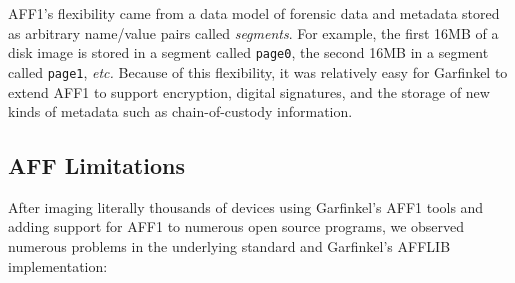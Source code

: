 \documentclass[10pt, conference]{IEEEtran}
\begin{document}
AFF1's flexibility came from a data model of forensic data and metadata
stored as arbitrary name/value pairs called \emph{segments}. For
example, the first 16MB of a disk image is stored in a segment called
\texttt{page0}, the second 16MB in a segment called \texttt{page1},
\emph{etc.} Because of this flexibility, it was relatively easy for
Garfinkel to extend AFF1 to support encryption, digital signatures, and
the storage of new kinds of metadata such as chain-of-custody
information\cite{garfinkel:affcrypto}. 

\subsection{AFF Limitations}
After imaging literally thousands of devices using Garfinkel's AFF1
tools and adding support for AFF1 to numerous open source programs, we
observed numerous problems in the underlying standard
and Garfinkel's AFFLIB implementation:
\end{document}
